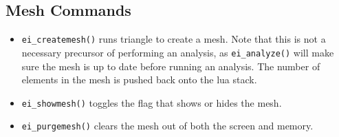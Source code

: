 \subsection{Mesh Commands}

\begin{itemize}
\item \texttt{ei\_createmesh()} runs triangle to create a mesh. Note that this is not
a necessary precursor of performing an analysis, as
\texttt{ei\_analyze()} will make sure the mesh is up to date before
running an analysis. The number of elements in the mesh is pushed
back onto the lua stack.

\item \texttt{ei\_showmesh()} toggles the flag that shows or hides the mesh.

\item \texttt{ei\_purgemesh()} clears the mesh out of both the screen and memory.
\end{itemize}

